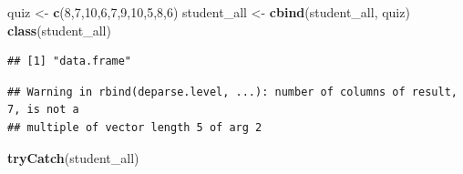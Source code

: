 \documentclass[
]{article}
\newenvironment{Shaded}{\begin{snugshade}}{\end{snugshade}}
\newcommand{\AttributeTok}[1]{\textcolor[rgb]{0.13,0.29,0.53}{#1}}
\newcommand{\ConstantTok}[1]{\textcolor[rgb]{0.56,0.35,0.01}{#1}}
\newcommand{\DecValTok}[1]{\textcolor[rgb]{0.00,0.00,0.81}{#1}}
\newcommand{\FunctionTok}[1]{\textcolor[rgb]{0.13,0.29,0.53}{\textbf{#1}}}
\newcommand{\NormalTok}[1]{#1}
\newcommand{\OtherTok}[1]{\textcolor[rgb]{0.56,0.35,0.01}{#1}}
\newcommand{\SpecialCharTok}[1]{\textcolor[rgb]{0.81,0.36,0.00}{\textbf{#1}}}
\begin{document}
\begin{Shaded}
\begin{Highlighting}[]
\NormalTok{quiz }\OtherTok{\textless{}{-}} \FunctionTok{c}\NormalTok{(}\DecValTok{8}\NormalTok{,}\DecValTok{7}\NormalTok{,}\DecValTok{10}\NormalTok{,}\DecValTok{6}\NormalTok{,}\DecValTok{7}\NormalTok{,}\DecValTok{9}\NormalTok{,}\DecValTok{10}\NormalTok{,}\DecValTok{5}\NormalTok{,}\DecValTok{8}\NormalTok{,}\DecValTok{6}\NormalTok{)}
\NormalTok{student\_all }\OtherTok{\textless{}{-}} \FunctionTok{cbind}\NormalTok{(student\_all, quiz)}
\FunctionTok{class}\NormalTok{(student\_all)}
\end{Highlighting}
\end{Shaded}

\begin{verbatim}
## [1] "data.frame"
\end{verbatim}

\begin{Shaded}
\end{Shaded}

\begin{verbatim}
## Warning in rbind(deparse.level, ...): number of columns of result, 7, is not a
## multiple of vector length 5 of arg 2
\end{verbatim}

\begin{Shaded}
\begin{Highlighting}[]
\FunctionTok{tryCatch}\NormalTok{(student\_all)}
\end{Highlighting}
\end{Shaded}
\end{document}
